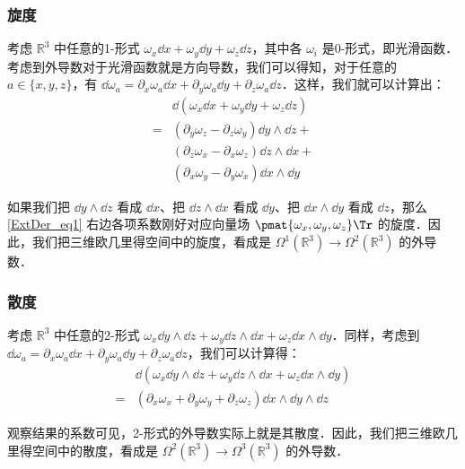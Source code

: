 \subsubsection{旋度}

考虑 $\mathbb{R}^3$ 中任意的1-形式 $\omega_x\dd x+\omega_y\dd y+\omega_z\dd z$，其中各 $\omega_i$ 是0-形式，即光滑函数．考虑到外导数对于光滑函数就是方向导数，我们可以得知，对于任意的 $a\in\{x,y,z\}$，有 $\dd\omega_a=\partial_x\omega_a\dd x+\partial_y\omega_a\dd y+\partial_z\omega_a\dd z$．这样，我们就可以计算出：
\begin{equation}\label{ExtDer_eq1}
\begin{aligned}
&\dd(\omega_x\dd x+\omega_y\dd y+\omega_z\dd z)\\=&(\partial_y\omega_z-\partial_z\omega_y)\dd y\wedge\dd z+\\&(\partial_z\omega_x-\partial_x\omega_z)\dd z\wedge\dd x+\\&(\partial_x\omega_y-\partial_y\omega_x)\dd x\wedge\dd y
\end{aligned}
\end{equation}

如果我们把 $\dd y\wedge\dd z$ 看成 $\dd x$、把 $\dd z\wedge\dd x$ 看成 $\dd y$、把 $\dd x\wedge\dd y$ 看成 $\dd z$，那么\autoref{ExtDer_eq1} 右边各项系数刚好对应向量场 $\pmat{\omega_x, \omega_y, \omega_z}\Tr$ 的旋度．因此，我们把三维欧几里得空间中的旋度，看成是 $\Omega^1(\mathbb{R}^3)\rightarrow\Omega^2(\mathbb{R}^3)$ 的外导数．

\subsubsection{散度}

考虑 $\mathbb{R}^3$ 中任意的2-形式 $\omega_x\dd y\wedge\dd z+\omega_y\dd z\wedge\dd x+\omega_z\dd x\wedge\dd y$．同样，考虑到 $\dd\omega_a=\partial_x\omega_a\dd x+\partial_y\omega_a\dd y+\partial_z\omega_a\dd z$，我们可以计算得：
\begin{equation}\label{ExtDer_eq2}
\begin{aligned}
&\dd(\omega_x\dd y\wedge\dd z+\omega_y\dd z\wedge\dd x+\omega_z\dd x\wedge\dd y)\\=&(\partial_x\omega_x+\partial_y\omega_y+\partial_z\omega_z)\dd x\wedge\dd y\wedge\dd z
\end{aligned}
\end{equation}

观察结果的系数可见，2-形式的外导数实际上就是其散度．因此，我们把三维欧几里得空间中的散度，看成是 $\Omega^2(\mathbb{R}^3)\rightarrow\Omega^3(\mathbb{R}^3)$ 的外导数．

